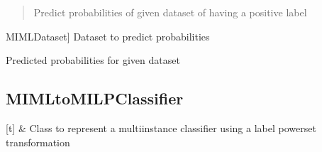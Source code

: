 \documentclass[letterpaper,10pt,english]{sphinxmanual}
\begin{document}
\begin{fulllineitems}
\begin{fulllineitems}
\label{\detokenize{classifier/mimlTOmi/_autosummary/miml.classifier.mimlTOmi.miml_to_mi_br_classifier.MIMLtoMIBRClassifier:miml.classifier.mimlTOmi.miml_to_mi_br_classifier.MIMLtoMIBRClassifier.predict_proba}}
\pysigstartsignatures
\pysiglinewithargsret
{}
{}
{}
\pysigstopsignatures\begin{quote}

\sphinxAtStartPar
Predict probabilities of given dataset of having a positive label
\end{quote}
\begin{description}
\begin{description}
\sphinxlineitem{dataset\_test}{[}MIMLDataset{]}
\sphinxAtStartPar
Dataset to predict probabilities

\end{description}
\begin{description}
\sphinxAtStartPar
Predicted probabilities for given dataset

\end{description}

\end{description}

\end{fulllineitems}


\end{fulllineitems}


\sphinxstepscope


\subsection{MIMLtoMILPClassifier}
\label{\detokenize{classifier/mimlTOmi/miml_to_mi_lp_classifier:mimltomilpclassifier}}\label{\detokenize{classifier/mimlTOmi/miml_to_mi_lp_classifier::doc}}

\begin{savenotes}\sphinxattablestart
\sphinxthistablewithglobalstyle
\sphinxthistablewithnovlinesstyle
\centering
\begin{tabulary}{\linewidth}[t]{}
\sphinxtoprule
\sphinxtableatstartofbodyhook
\sphinxAtStartPar
{\hyperref[\detokenize{classifier/mimlTOmi/_autosummary/miml.classifier.mimlTOmi.miml_to_mi_lp_classifier.MIMLtoMILPClassifier:miml.classifier.mimlTOmi.miml_to_mi_lp_classifier.MIMLtoMILPClassifier}]{}}
&
\sphinxAtStartPar
Class to represent a multi\sphinxhyphen{}instance classifier using a label powerset transformation
\\
\sphinxbottomrule
\end{tabulary}
\sphinxtableafterendhook\par
\sphinxattableend\end{savenotes}
\end{document}
